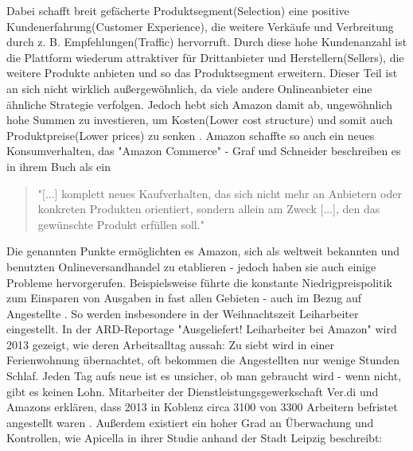 \noindent Dabei schafft breit gefächerte Produktsegment(Selection) eine positive Kundenerfahrung(Customer Experience), die weitere Verkäufe und Verbreitung durch z. B. Empfehlungen(Traffic) hervorruft. Durch diese hohe Kundenanzahl ist die Plattform wiederum attraktiver für Drittanbieter und Herstellern(Sellers), die weitere Produkte anbieten und so das Produktsegment erweitern. Dieser Teil ist an sich nicht wirklich außergewöhnlich, da viele andere Onlineanbieter eine ähnliche Strategie verfolgen. Jedoch hebt sich Amazon damit ab, ungewöhnlich hohe Summen zu investieren, um Kosten(Lower cost structure) und somit auch Produktpreise(Lower prices) zu senken \cite[S. 26f]{Graf}. Amazon schaffte so auch ein neues Konsumverhalten, das "Amazon Commerce" - Graf und Schneider beschreiben es in ihrem Buch als ein

\begin{quote}
    "[...] komplett neues Kaufverhalten, das sich nicht mehr an Anbietern oder konkreten Produkten orientiert, sondern allein am Zweck [...], den das gewünschte Produkt erfüllen soll." \cite[S. 42]{Graf}
\end{quote}
Die genannten Punkte ermöglichten es Amazon, sich als weltweit bekannten und benutzten Onlineversandhandel zu etablieren - jedoch haben sie auch einige Probleme hervorgerufen. Beispielsweise führte die konstante Niedrigpreispolitik \cite[Abb. 5]{Desjardins} zum Einsparen von Ausgaben in fast allen Gebieten - auch im Bezug auf Angestellte \cite[S. 6]{Apicella}. So werden insbesondere in der Weihnachtszeit Leiharbeiter eingestellt. In der ARD-Reportage "Ausgeliefert! Leiharbeiter bei Amazon" wird 2013 gezeigt, wie deren Arbeitsalltag aussah: Zu siebt wird in einer Ferienwohnung übernachtet, oft bekommen die Angestellten nur wenige Stunden Schlaf. Jeden Tag aufs neue ist es unsicher, ob man gebraucht wird - wenn nicht, gibt es keinen Lohn. Mitarbeiter der Dienstleistungsgewerkschaft Ver.di und Amazons erklären, dass 2013 in Koblenz circa 3100 von 3300 Arbeitern befristet angestellt waren \cite{Ausgeliefert}.
Außerdem existiert ein hoher Grad an Überwachung und Kontrollen, wie Apicella in ihrer Studie anhand der Stadt Leipzig beschreibt:

